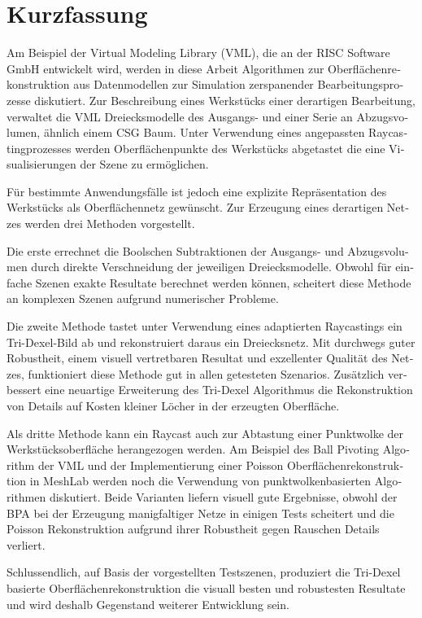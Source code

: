 \chapter*{Kurzfassung}

\begin{otherlanguage}{ngerman}
	Am Beispiel der Virtual Modeling Library (VML), die an der RISC Software GmbH entwickelt wird, werden in diese Arbeit Algorithmen zur Oberflächenrekonstruktion aus Datenmodellen zur Simulation zerspanender Bearbeitungsprozesse diskutiert.
	Zur Beschreibung eines Werkstücks einer derartigen Bearbeitung, verwaltet die VML Dreiecksmodelle des Ausgangs- und einer Serie an Abzugsvolumen, ähnlich einem CSG Baum.
	Unter Verwendung eines angepassten Raycastingprozesses werden Oberflächenpunkte des Werkstücks abgetastet die eine Visualisierungen der Szene zu ermöglichen.

	Für bestimmte Anwendungsfälle ist jedoch eine explizite Repräsentation des Werkstücks als Oberflächennetz gewünscht.
	Zur Erzeugung eines derartigen Netzes werden drei Methoden vorgestellt.

	Die erste errechnet die Boolschen Subtraktionen der Ausgangs- und Abzugsvolumen durch direkte Verschneidung der jeweiligen Dreiecksmodelle.
	Obwohl für einfache Szenen exakte Resultate berechnet werden können, scheitert diese Methode an komplexen Szenen aufgrund numerischer Probleme.

	Die zweite Methode tastet unter Verwendung eines adaptierten Raycastings ein Tri-Dexel-Bild ab und rekonstruiert daraus ein Dreiecksnetz.
	Mit durchwegs guter Robustheit, einem visuell vertretbaren Resultat und exzellenter Qualität des Netzes, funktioniert diese Methode gut in allen getesteten Szenarios.
	Zusätzlich verbessert eine neuartige Erweiterung des Tri-Dexel Algorithmus die Rekonstruktion von Details auf Kosten kleiner Löcher in der erzeugten Oberfläche.

	Als dritte Methode kann ein Raycast auch zur Abtastung einer Punktwolke der Werkstücksoberfläche herangezogen werden.
	Am Beispiel des Ball Pivoting Algorithm der VML und der Implementierung einer Poisson Oberflächenrekonstruktion in MeshLab werden noch die Verwendung von punktwolkenbasierten Algorithmen diskutiert.
	Beide Varianten liefern visuell gute Ergebnisse, obwohl der BPA bei der Erzeugung manigfaltiger Netze in einigen Tests scheitert und die Poisson Rekonstruktion aufgrund ihrer Robustheit gegen Rauschen Details verliert.

	Schlussendlich, auf Basis der vorgestellten Testszenen, produziert die Tri-Dexel basierte Oberflächenrekonstruktion die visuall besten und robustesten Resultate und wird deshalb Gegenstand weiterer Entwicklung sein.
\end{otherlanguage}

